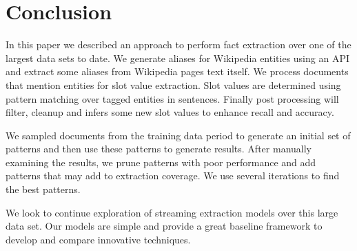 
\section{Conclusion}

In this paper we described an approach to perform fact extraction over one of the largest data sets to date. 
We generate aliases for Wikipedia entities using an API and extract some aliases from Wikipedia pages text itself.
We process documents that mention entities for slot value extraction.
Slot values are determined using pattern matching over tagged entities in sentences.
Finally post processing will filter, cleanup and infers some new slot values to enhance recall and accuracy. 

We sampled documents from the training data period to generate an initial set of patterns and then use these patterns to generate results.
After manually examining the results, we prune patterns with poor performance and add patterns that may add to extraction coverage.
We use several iterations to find the best patterns.



We look to continue exploration of streaming extraction models over this large data set.
Our models are simple and provide a great baseline framework to develop and compare innovative techniques.





